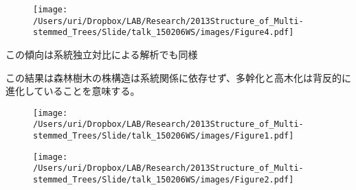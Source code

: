 \documentclass[a0, 36pt, plainboxedsections]{sciposter} %
\renewcommand{\baselinestretch}{1.2}
\begin{document}
\begin{multicols}{2}
\begin{figure}
\begin{center}
		\texttt{[image: /Users/uri/Dropbox/LAB/Research/2013Structure\_of\_Multi-stemmed\_Trees/Slide/talk\_150206WS/images/Figure4.pdf]}
	\end{center}
\end{figure}

\columnbreak
\renewcommand{\baselinestretch}{0.8}
\begin{mdframed}[style=subsection.frame]
  \huge\textbf{}
\end{mdframed}
\renewcommand{\baselinestretch}{1.2} %

\begin{list}{}{\setlength{\itemindent}{1em}}
  \item この傾向は系統独立対比による解析でも同様
\end{list}

この結果は森林樹木の株構造は系統関係に依存せず、多幹化と高木化は背反的に進化していることを意味する。

\begin{figure}
	\begin{center}
		\texttt{[image: /Users/uri/Dropbox/LAB/Research/2013Structure\_of\_Multi-stemmed\_Trees/Slide/talk\_150206WS/images/Figure1.pdf]}
		
		\texttt{[image: /Users/uri/Dropbox/LAB/Research/2013Structure\_of\_Multi-stemmed\_Trees/Slide/talk\_150206WS/images/Figure2.pdf]}
	\end{center}
\end{figure}

\end{multicols}
\begin{mdframed}[style=section.frame]
  \centering\huge\textbf{}
\end{mdframed}
\end{document}
